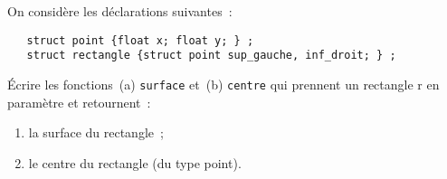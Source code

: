   On consid\`ere les d\'eclarations suivantes~:
\begin{verbatim}
   struct point {float x; float y; } ;
   struct rectangle {struct point sup_gauche, inf_droit; } ;
\end{verbatim}
  \'Ecrire les fonctions~(a) \texttt{surface} et~(b) \texttt{centre}  qui
  prennent un rectangle r en param\`etre et retournent~:
  \begin{enumerate}
  \item la surface du rectangle~;
  \item le centre du rectangle (du type point).
  \end{enumerate}
